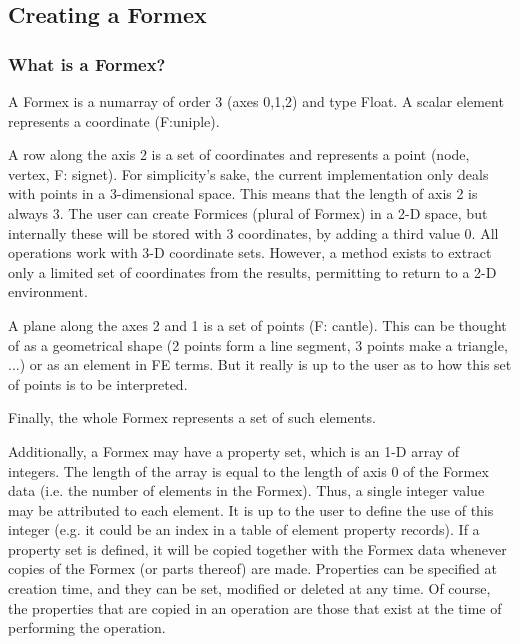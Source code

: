 \subsection{Creating a Formex}
\label{subsec:create}

\subsubsection{What is a Formex?}
A Formex is a numarray of order 3 (axes 0,1,2) and type Float.
A scalar element represents a coordinate (F:uniple).

    A row along the axis 2 is a set of coordinates and represents a point
    (node, vertex, F: signet).
    For simplicity's sake, the current implementation only deals with points
    in a 3-dimensional space. This means that the length of axis 2 is always 3.
    The user can create Formices (plural of Formex) in a 2-D space, but
    internally these will be stored with 3 coordinates, by adding a third
    value 0. All operations work with 3-D coordinate sets. However, a method
    exists to extract only a limited set of coordinates from the results,
    permitting to return to a 2-D environment.

    A plane along the axes 2 and 1 is a set of points (F: cantle). This can be
    thought of as a geometrical shape (2 points form a line segment, 3 points
    make a triangle, ...) or as an element in FE terms. But it really is up to
    the user as to how this set of points is to be interpreted.

    Finally, the whole Formex represents a set of such elements.

    Additionally, a Formex may have a property set, which is an 1-D array of
    integers. The length of the array is equal to the length of axis 0 of the
    Formex data (i.e. the number of elements in the Formex). Thus, a single
    integer value may be attributed to each element. It is up to the user to
    define the use of this integer (e.g. it could be an index in a table of
    element property records).
    If a property set is defined, it will be copied together with the Formex
    data whenever copies of the Formex (or parts thereof) are made.
    Properties can be specified at creation time, and they can be set,
    modified or deleted at any time. Of course, the properties that are
    copied in an operation are those that exist at the time of performing
    the operation.   

